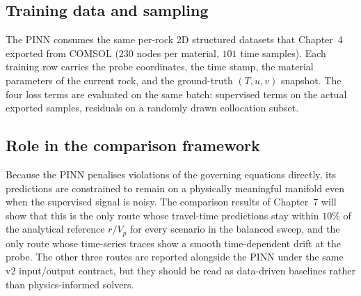 \subsection{Training data and sampling}

The PINN consumes the same per-rock 2D structured datasets that
Chapter~4 exported from COMSOL ($230$ nodes per material,
$101$ time samples). Each training row carries the probe coordinates,
the time stamp, the material parameters of the current rock, and the
ground-truth $(T,u,v)$ snapshot. The four loss terms are evaluated on
the same batch: supervised terms on the actual exported samples,
residuals on a randomly drawn collocation subset.

\subsection{Role in the comparison framework}

Because the PINN penalises violations of the governing equations
directly, its predictions are constrained to remain on a physically
meaningful manifold even when the supervised signal is noisy. The
comparison results of Chapter~7 will show that this is the only route
whose travel-time predictions stay within $10\%$ of the analytical
reference $r/V_p$ for every scenario in the balanced sweep, and the
only route whose time-series traces show a smooth time-dependent
drift at the probe. The other three routes are reported alongside the
PINN under the same v2 input/output contract, but they should be
read as data-driven baselines rather than physics-informed solvers.
